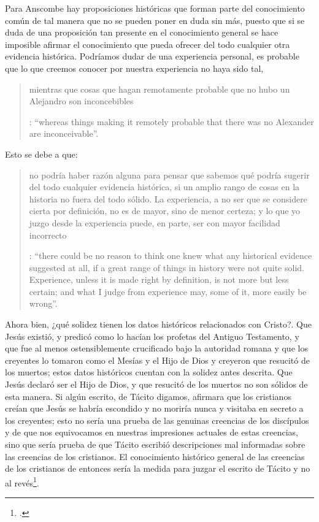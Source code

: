 Para Anscombe hay proposiciones históricas que forman parte del conocimiento común de tal manera que no se pueden poner en duda sin más, puesto que si se duda de una proposición tan presente en el conocimiento general se hace imposible afirmar el conocimiento que pueda ofrecer del todo cualquier otra evidencia histórica. Podríamos dudar de una experiencia personal, es probable que lo que creemos conocer por nuestra experiencia no haya sido tal, \blockquote[{\Cite[27]{anscombe2008faith:prophandmi}}: \enquote{whereas things making it remotely probable that there was no Alexander are inconceivable}.]{mientras que cosas que hagan remotamente probable que no hubo un Alejandro son inconcebibles}. Esto se debe a que: \blockquote[{\Cite[27]{anscombe2008faith:prophandmi}}: \enquote{there could be no reason to think one knew what any historical evidence suggested at all, if a great range of things in history were not quite solid. Experience, unless it is made right by definition, is not more but less certain; and what I judge from experience may, some of it, more easily be wrong}.]{no podría haber razón alguna para pensar que sabemos qué podría sugerir del todo cualquier evidencia histórica, si un amplio rango de cosas en la historia no fuera del todo sólido. La experiencia, a no ser que se considere cierta por definición, no es de mayor, sino de menor certeza; y lo que yo juzgo desde la experiencia puede, en parte, ser con mayor facilidad incorrecto}.

Ahora bien, ¿qué solidez tienen los datos históricos relacionados con Cristo?. Que Jesús existió, y predicó como lo hacían los profetas del Antiguo Testamento, y que fue al menos ostensiblemente crucificado bajo la autoridad romana y que los creyentes lo tomaron como el Mesías y el Hijo de Dios y creyeron que resucitó de los muertos; estos datos históricos cuentan con la solidez antes descrita. Que Jesús declaró ser el Hijo de Dios, y que resucitó de los muertos no son sólidos de esta manera. Si algún escrito, de Tácito digamos, afirmara que los cristianos creían que Jesús se habría escondido y no moriría nunca y visitaba en secreto a los creyentes; esto no sería una prueba de las genuinas creencias de los discípulos y de que nos equivocamos en nuestras impresiones actuales de estas creencias, sino que sería prueba de que Tácito escribió descripciones mal informadas sobre las creencias de los cristianos. El conocimiento histórico general de las creencias de los cristianos de entonces sería la medida para juzgar el escrito de Tácito y no al revés\footnote{\cite[Cf.][28]{anscombe2008faith:prophandmi}.}.

